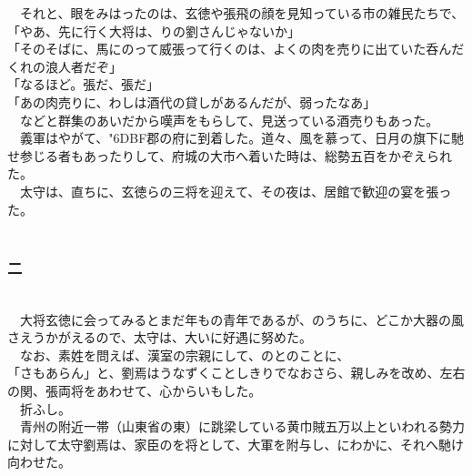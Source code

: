 \documentclass[
  paper=a5,
  fontsize=10pt,
  jafontsize=9.5pt,
  tate,                  %
  open_bracket_pos=nibu, %
]{jlreq}
\begin{document}
　それと、眼をみはったのは、玄徳や張飛の顔を見知っている市の雑民たちで、\\


「やあ、先に行く大将は、りの劉さんじゃないか」\\


「そのそばに、馬にのって威張って行くのは、よくの肉を売りに出ていた呑んだくれの浪人者だぞ」\\


「なるほど。張だ、張だ」\\


「あの肉売りに、わしは酒代の貸しがあるんだが、弱ったなあ」\\


　などと群集のあいだから嘆声をもらして、見送っている酒売りもあった。\\


　義軍はやがて、{\char"6DBF}郡の府に到着した。道々、風を慕って、日月の旗下に馳せ参じる者もあったりして、府城の大市へ着いた時は、総勢五百をかぞえられた。\\


　太守は、直ちに、玄徳らの三将を迎えて、その夜は、居館で歓迎の宴を張った。\\

\\

\subsubsection{二}

\\


　大将玄徳に会ってみるとまだ年もの青年であるが、のうちに、どこか大器の風さえうかがえるので、太守は、大いに好遇に努めた。\\


　なお、素姓を問えば、漢室の宗親にして、のとのことに、\\


「さもあらん」と、劉焉はうなずくことしきりでなおさら、親しみを改め、左右の関、張両将をあわせて、心からいもした。\\


　折ふし。\\


　青州の附近一帯（山東省の東）に跳梁している黄巾賊五万以上といわれる勢力に対して太守劉焉は、家臣のを将として、大軍を附与し、にわかに、それへ馳け向わせた。\\
\end{document}
